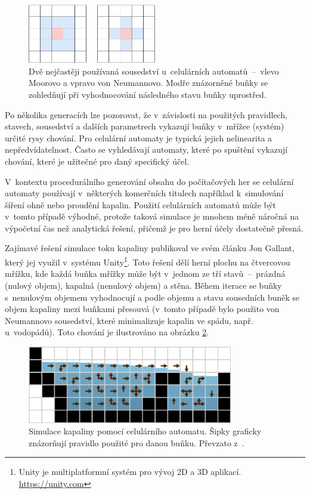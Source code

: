 \begin{figure}[hbt]
    \centering
    \includegraphics[width=0.5\textwidth]{obrazky/cellular_sousedstvi.pdf}
    \caption{Dvě nejčastěji používaná sousedství u~celulárních automatů~--~vlevo Moorovo a vpravo von Neumannovo. Modře znázorněné buňky se zohledňují při vyhodnocování následného stavu buňky uprostřed.}
    \label{img:cellular_sousedstvi}
\end{figure}
\par
Po několika generacích lze pozorovat, že v~závislosti na použitých pravidlech, stavech, sousedství a dalších parametrech vykazují buňky v~mřížce (systém) určité rysy chování.
Pro celulární automaty je typická jejich nelinearita a nepředvídatelnost.
Často se vyhledávají automaty, které po spuštění vykazují chování, které je užitečné pro daný specifický účel.
\par
V~kontextu procedurálního generování obsahu do počítačových her se celulární automaty používají v~některých komerčních titulech například k~simulování šíření ohně nebo proudění kapalin.
Použití celulárních automatů může být v~tomto případě výhodné, protože taková simulace je mnohem méně náročná na výpočetní čas než analytická řešení, přičemž je pro herní účely dostatečně přesná.
\par
Zajímavé řešení simulace toku kapaliny publikoval ve svém článku\cite{lit:2d_liquid_cellular} Jon Gallant, který jej využil v~systému Unity\footnote{Unity je multiplatformní systém pro vývoj 2D a 3D aplikací. \url{https://unity.com}}.
Toto řešení dělí herní plochu na čtvercovou mřížku, kde každá buňka mřížky může být v~jednom ze tří stavů~--~prázdná (nulový objem), kapalná (nenulový objem) a stěna.
Během iterace se buňky s~nenulovým objemem vyhodnocují a podle objemu a stavu sousedních buněk se objem kapaliny mezi buňkami přesouvá (v~tomto případě bylo použito von Neumannovo sousedství, které minimalizuje  kapalin ve spádu, např. u~vodopádů).
Toto chování je ilustrováno na obrázku \ref{img:cellular_2d_liquid}.
\begin{figure}[hbt]
    \centering
    \includegraphics[width=0.8\textwidth]{obrazky/cellular_2d_liquid.png}
    \caption{Simulace kapaliny pomocí celulárního automatu. Šipky graficky znázorňují pravidlo použité pro danou buňku. Převzato z~\cite{lit:2d_liquid_cellular}.}
    \label{img:cellular_2d_liquid}
\end{figure}
